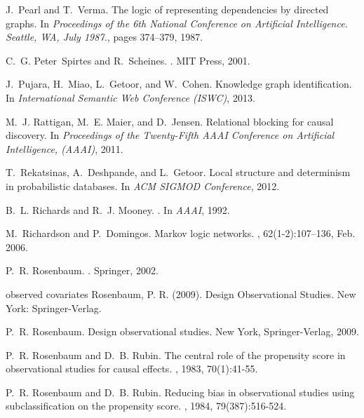 \begin{thebibliography}{10}
J.~Pearl and T.~Verma.
\newblock The logic of representing dependencies by directed graphs.
\newblock In {\em Proceedings of the 6th National Conference on Artificial
  Intelligence. Seattle, WA, July 1987.}, pages 374--379, 1987.

C.~G. Peter~Spirtes and R.~Scheines.
.
\newblock MIT Press, 2001.

J.~Pujara, H.~Miao, L.~Getoor, and W.~Cohen.
\newblock Knowledge graph identification.
\newblock In {\em International Semantic Web Conference (ISWC)}, 2013.

M.~J. Rattigan, M.~E. Maier, and D.~Jensen.
\newblock Relational blocking for causal discovery.
\newblock In {\em Proceedings of the Twenty-Fifth {AAAI} Conference on
  Artificial Intelligence, ({AAAI})}, 2011.

T.~Rekatsinas, A.~Deshpande, and L.~Getoor.
\newblock Local structure and determinism in probabilistic databases.
\newblock In {\em ACM SIGMOD Conference}, 2012.

B.~L. Richards and R.~J. Mooney.
.
\newblock In {\em AAAI}, 1992.

M.~Richardson and P.~Domingos.
\newblock Markov logic networks.
, 62(1-2):107--136, Feb. 2006.

P.~R. Rosenbaum.
.
\newblock Springer, 2002.


observed covariates Rosenbaum, P. R. (2009). Design Observational Studies. New York: Springer-Verlag.

P.~R. Rosenbaum.
\newblock Design observational studies.
\newblock New York, Springer-Verlag, 2009.

P.~R. Rosenbaum and D.~B. Rubin.
\newblock The central role of the propensity score in observational studies for
  causal effects.
, 1983, 70(1):41-55.

P.~R. Rosenbaum and D.~B. Rubin.
\newblock Reducing bias in observational studies using subclassification on the propensity score.
, 1984, 79(387):516-524.




\end{thebibliography}
